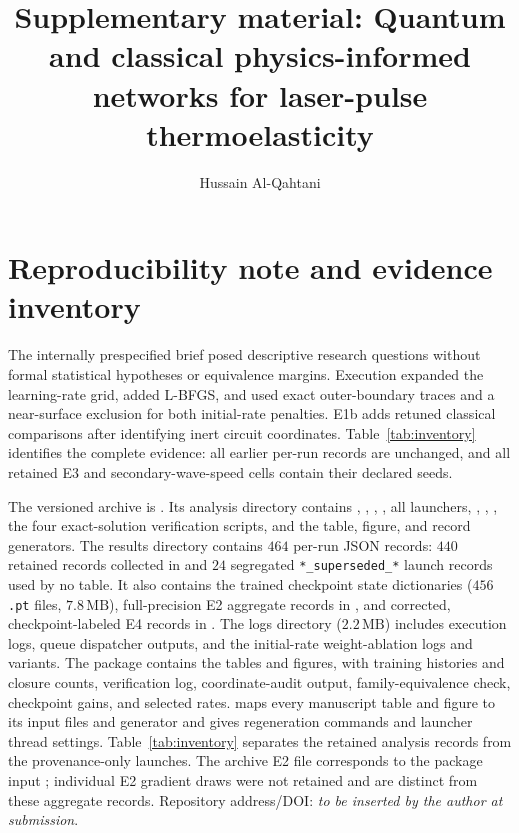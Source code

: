 \documentclass[11pt]{article}
\title{Supplementary material: Quantum and classical physics-informed
networks for laser-pulse thermoelasticity}
\author{Hussain Al-Qahtani}
\date{}
\begin{document}
\maketitle

\section{Reproducibility note and evidence inventory}

The internally prespecified brief posed descriptive research questions
without formal statistical hypotheses or equivalence margins. Execution
expanded the learning-rate grid, added L-BFGS, and used exact outer-boundary
traces and a near-surface exclusion for both initial-rate penalties. E1b
adds retuned classical comparisons after identifying inert circuit
coordinates. Table~\ref{tab:inventory} identifies the complete evidence:
all earlier per-run records are unchanged, and all retained E3 and
secondary-wave-speed cells contain their declared seeds.

The versioned archive is
. Its analysis directory contains
, , ,
, all launchers, ,
, , the four
exact-solution verification scripts, and the table, figure, and record
generators. The results directory contains $464$ per-run JSON records:
$440$ retained records collected in  and $24$
segregated \texttt{*\_superseded\_*} launch records used by no table.
It also contains the trained checkpoint state dictionaries
($456$ \texttt{.pt} files, $7.8\,\mathrm{MB}$), full-precision E2
aggregate records in , and corrected,
checkpoint-labeled E4 records in .
The logs directory ($2.2\,\mathrm{MB}$) includes execution logs, queue
dispatcher outputs, and the initial-rate weight-ablation logs and variants.
The package contains the tables and figures,  with
training histories and closure counts, verification log, coordinate-audit
output, family-equivalence check, checkpoint gains, and selected rates.
 maps every manuscript table and figure to its input
files and generator and gives regeneration commands and launcher thread
settings. Table~\ref{tab:inventory} separates the retained analysis records
from the provenance-only launches. The archive E2 file corresponds to the
package input ; individual E2 gradient draws were not
retained and are distinct from these aggregate records.
Repository address/DOI: \textit{to be inserted by the author at submission}.
\end{document}

